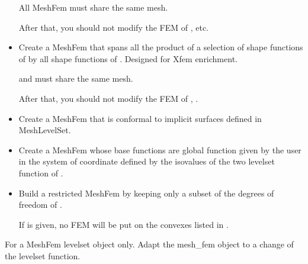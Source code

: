\documentclass[a4paper,11pt,english]{sphinxmanual}
\begin{document}
\begin{fulllineitems}
\begin{itemize}
All MeshFem must share the same mesh.

After that, you should not modify the FEM of ,  etc.

\item {} 
Create a MeshFem that spans all the product of a selection of shape
functions of  by all shape functions of .
Designed for Xfem enrichment.

 and  must share the same mesh.

After that, you should not modify the FEM of , .

\item {} 
Create a MeshFem that is conformal to implicit surfaces defined in
MeshLevelSet.

\item {} 
Create a MeshFem whose base functions are global function given by the
user in the system of coordinate defined by the iso\sphinxhyphen{}values of the two
level\sphinxhyphen{}set function of .

\item {} 
Build a restricted MeshFem by keeping only a subset of the degrees of
freedom of .

If  is given, no FEM will be put on the convexes listed in
.

\end{itemize}

\begin{fulllineitems}
\label{\detokenize{python/cmdref_MeshFem:getfem.MeshFem.adapt}}
For a MeshFem levelset object only. Adapt the mesh\_fem object to a
change of the levelset function.

\end{fulllineitems}


\end{fulllineitems}
\end{document}
